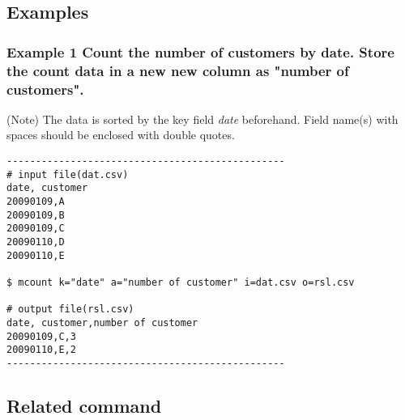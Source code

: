 \documentclass[a4paper]{jarticle}
\begin{document}
\subsection*{Examples}
\subsubsection*{Example 1 Count the number of customers by date. Store the count data in a new new column as "number of customers".}
(Note) The data is sorted by the key field \emph{date} beforehand. Field name(s) with spaces should be enclosed with double quotes. 

\begin{verbatim}
------------------------------------------------
# input file(dat.csv)
date, customer
20090109,A
20090109,B
20090109,C
20090110,D
20090110,E

$ mcount k="date" a="number of customer" i=dat.csv o=rsl.csv

# output file(rsl.csv)
date, customer,number of customer
20090109,C,3
20090110,E,2
------------------------------------------------
\end{verbatim}

\subsection*{Related command}
\noindent
\end{document}
